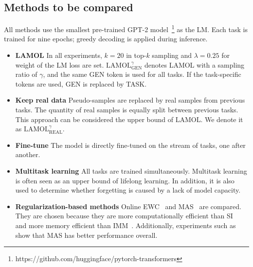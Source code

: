 \documentclass{article} %
\begin{document}



\subsection{Methods to be compared}

All methods use the smallest pre-trained GPT-2 model~\citep{radford2019language}\footnote{https://github.com/huggingface/pytorch-transformers} as the LM.
Each task is trained for nine epochs; greedy decoding is applied during inference.

\begin{itemize}[leftmargin=*]

    \item \textbf{LAMOL} In all experiments, $k = 20$ in top-$k$ sampling and $\lambda = 0.25$ for weight of the LM loss are set.
$\text{LAMOL}^{\gamma}_{\text{GEN}}$ denotes LAMOL with a sampling ratio of $\gamma$, and the same GEN token is used for all tasks.
If the task-specific tokens are used, GEN is replaced by TASK.

    \item \textbf{Keep real data} Pseudo-samples are replaced by real samples from previous tasks. 
The quantity of real samples is equally split between previous tasks.
This approach can be considered the upper bound of LAMOL.
We denote it as $\text{LAMOL}^{\gamma}_{\text{REAL}}$.

    \item \textbf{Fine-tune}
The model is directly fine-tuned on the stream of tasks, one after another.

    \item \textbf{Multitask learning} All tasks are trained simultaneously.
Multitask learning is often seen as an upper bound of lifelong learning.
In addition, it is also used to determine whether forgetting is caused by a lack of model capacity.

    \item \textbf{Regularization-based methods}
Online EWC~\citep{schwarz2018progress} and MAS~\citep{aljundi2018memory} are compared.
They are chosen because they are more computationally efficient than SI~\citep{zenke2017continual} and more memory efficient than 
IMM~\citep{lee2017overcoming}.
Additionally, experiments such as~\cite{elhoseiny2018exploring} show that MAS has better performance overall.


\end{itemize}
\end{document}
